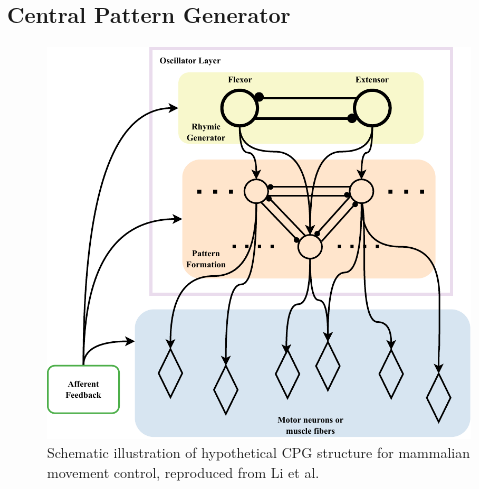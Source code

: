 \subsection{Central Pattern Generator}
\begin{figure}[htb]
    \centering
    \includegraphics[width=0.7\linewidth]{img/chap2/CPG.pdf}
    \caption{Schematic illustration of hypothetical \ac{CPG} structure for mammalian movement control, reproduced from Li et al.\cite{li2013Humanoids}}
    \label{fig:cpg_structure}
\end{figure}

